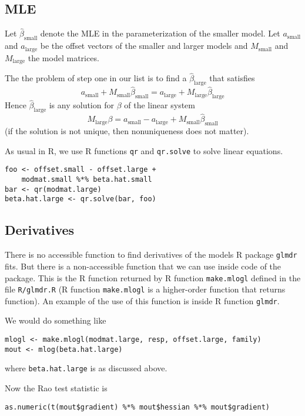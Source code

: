 \documentclass{article}
\begin{document}
\subsection{MLE}

Let $\hat{\beta}_\text{small}$ denote the MLE in the parameterization
of the smaller model.  Let $a_\text{small}$ and $a_\text{large}$ be the
offset vectors of the smaller and larger models and
$M_\text{small}$ and $M_\text{large}$ the model matrices.

The the problem of step one in our list is to find a $\hat{\beta}_\text{large}$
that satisfies
$$
   a_\text{small} + M_\text{small} \hat{\beta}_\text{small}
   =
   a_\text{large} + M_\text{large} \hat{\beta}_\text{large}
$$
Hence $\hat{\beta}_\text{large}$ is any solution for $\beta$ of the
linear system
$$
   M_\text{large} \beta
   =
   a_\text{small} - a_\text{large} + M_\text{small} \hat{\beta}_\text{small}
$$
(if the solution is not unique, then nonuniqueness does not matter).

As usual in R, we use R functions \texttt{qr} and \texttt{qr.solve} to
solve linear equations.
\begin{verbatim}
foo <- offset.small - offset.large +
    modmat.small %*% beta.hat.small
bar <- qr(modmat.large)
beta.hat.large <- qr.solve(bar, foo)
\end{verbatim}

\subsection{Derivatives}

There is no accessible function to find derivatives of the models R package
\texttt{glmdr} fits.  But there is a non-accessible function that we can
use inside code of the package.  This is the R function returned by
R function \texttt{make.mlogl} defined in the file \texttt{R/glmdr.R}
(R function \texttt{make.mlogl} is a higher-order function that returns
function).  An example of the use of this function is inside R function
\texttt{glmdr}.

We would do something like
\begin{verbatim}
mlogl <- make.mlogl(modmat.large, resp, offset.large, family)
mout <- mlog(beta.hat.large)
\end{verbatim}
where \texttt{beta.hat.large} is as discussed above.

Now the Rao test statistic is
\begin{verbatim}
as.numeric(t(mout$gradient) %*% mout$hessian %*% mout$gradient)
\end{verbatim}
\end{document}
